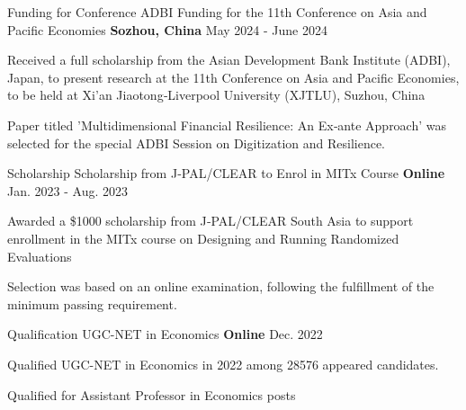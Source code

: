 \begin{cventries}
\cventry
{Funding for Conference} %
{ADBI Funding for the 11th Conference on Asia and Pacific Economies} %
{\textbf{Sozhou, China}} %
{May 2024 - June 2024} %
{ %
\begin{cvitems}
\item {Received a full scholarship from the Asian Development Bank Institute (ADBI), Japan, to present research at the 11th Conference on Asia and Pacific Economies, to be held at Xi’an Jiaotong‑Liverpool University (XJTLU), Suzhou, China}
\item {Paper titled 'Multidimensional Financial Resilience: An Ex‑ante Approach' was selected for the special ADBI Session on Digitization and Resilience.}
\end{cvitems}
}

\cventry
{Scholarship} %
{Scholarship from J‑PAL/CLEAR to Enrol in MITx Course } %
{\textbf{Online}} %
{Jan. 2023 - Aug. 2023} %
{ %
\begin{cvitems}
\item {Awarded a \$1000 scholarship from J‑PAL/CLEAR South Asia to support enrollment in the MITx course on Designing and Running Randomized Evaluations}
\item {Selection was based on an online examination, following the fulfillment of the minimum passing requirement.}
\end{cvitems}
}

\cventry
{Qualification} %
{UGC-NET in Economics } %
{\textbf{Online}} %
{Dec. 2022} %
{ %
\begin{cvitems}
\item {Qualified UGC-NET in Economics in 2022 among 28576 appeared candidates.}
\item {Qualified for Assistant Professor in Economics posts}
\end{cvitems}
}


\end{cventries}
